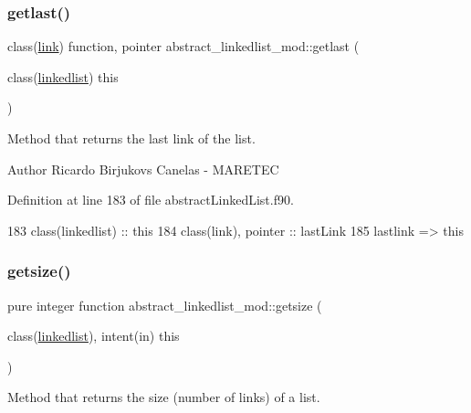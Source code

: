 \subsubsection{\texorpdfstring{getlast()}{getlast()}}
{\footnotesize\ttfamily class(\mbox{\hyperlink{structlink__mod_1_1link}{link}}) function, pointer abstract\+\_\+linkedlist\+\_\+mod\+::getlast (\begin{DoxyParamCaption}\item[{class(\mbox{\hyperlink{structabstract__linkedlist__mod_1_1linkedlist}{linkedlist}})}]{this }\end{DoxyParamCaption})\hspace{0.3cm}{\ttfamily [private]}}



Method that returns the last link of the list. 

\begin{DoxyAuthor}{Author}
Ricardo Birjukovs Canelas -\/ M\+A\+R\+E\+T\+EC 
\end{DoxyAuthor}


Definition at line 183 of file abstract\+Linked\+List.\+f90.


\begin{DoxyCode}
183     \textcolor{keywordtype}{class}(linkedlist) :: this
184     \textcolor{keywordtype}{class}(link), \textcolor{keywordtype}{pointer} :: lastLink
185     lastlink => this%
\end{DoxyCode}
\mbox{\label{namespaceabstract__linkedlist__mod_ab4e548906863da517d7fedb02931b79f}} 
\subsubsection{\texorpdfstring{getsize()}{getsize()}}
{\footnotesize\ttfamily pure integer function abstract\+\_\+linkedlist\+\_\+mod\+::getsize (\begin{DoxyParamCaption}\item[{class(\mbox{\hyperlink{structabstract__linkedlist__mod_1_1linkedlist}{linkedlist}}), intent(in)}]{this }\end{DoxyParamCaption})\hspace{0.3cm}{\ttfamily [private]}}



Method that returns the size (number of links) of a list. 


